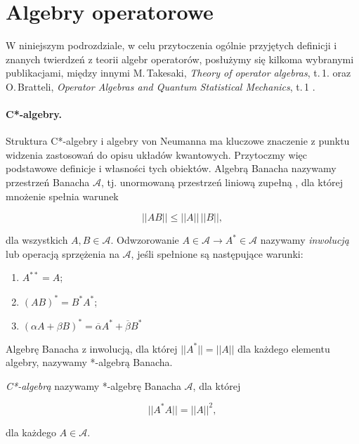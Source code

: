 \section{Algebry operatorowe}
W niniejszym podrozdziale,
w celu przytoczenia ogólnie przyjętych definicji
i znanych twierdzeń z teorii algebr operatorów,
posłużymy się kilkoma wybranymi publikacjami, między innymi
M.\,Takesaki, \emph{Theory of operator algebras}, t.\,1. \cite{Takesaki1} oraz
O.\,Bratteli, \emph{Operator Algebras and Quantum Statistical Mechanics}, t.\,1
\cite{Bratteli2003}.

\paragraph{C*-algebry.}
Struktura C*-algebry i algebry von Neumanna ma kluczowe znaczenie z punktu widzenia
zastosowań do opisu układów kwantowych.
Przytoczmy więc podstawowe definicje i własności tych obiektów.
Algebrą Banacha nazywamy przestrzeń Banacha $\mathcal{A}$,
tj. unormowaną przestrzeń liniową zupełną \cite{Rudin1991},
dla której mnożenie spełnia warunek
\begin{linenomath*}
 \begin{equation}
 \label{eq:algBanachMultiplication}
|| A B || \leq ||A|| \, ||B||,
 \end{equation}
\end{linenomath*}
dla wszystkich $A, B \in \mathcal{A}$.
Odwzorowanie $A \in \mathcal{A} \rightarrow A^{*} \in \mathcal{A}$ nazywamy
\emph{inwolucją}  lub
operacją sprzężenia na $\mathcal{A}$, jeśli spełnione są następujące warunki:
\begin{enumerate}
 \item $A^{**} = A$;
 \item $(AB)^{*} = B^{*} A^{*}$;
 \item $(\alpha A + \beta B)^{*} = %
  \overline{\alpha} A^{*} + \overline{\beta} B^{*}$
\end{enumerate}
Algebrę Banacha z inwolucją, dla której
$||A^{*}|| = ||A||$ dla każdego elementu
algebry, nazywamy *-algebrą Banacha.


\begin{Definition}
 \label{def:c*alg}
  \emph{C*-algebrą} nazywamy *-algebrę Banacha $\mathcal{A}$, dla której
\begin{linenomath*}
 \begin{equation}
 || A^{*} A || = ||A||^{2},
 \end{equation}
\end{linenomath*}
dla każdego $A \in \mathcal{A}$.
\end{Definition}

